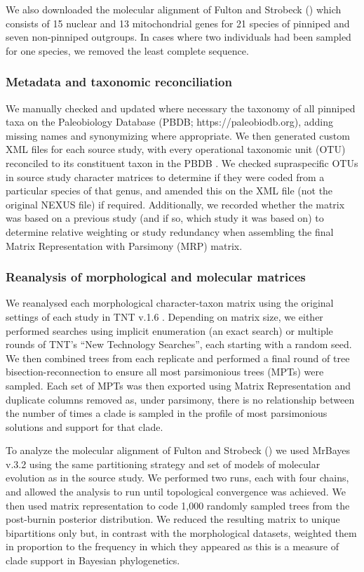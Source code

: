 \documentclass[a4paper, 12pt]{article}
\begin{document}
\noindent We also downloaded the molecular alignment of Fulton and Strobeck (\citeyear{fulton2010multiple}) which consists of 15 nuclear and 13 mitochondrial genes for 21 species of pinniped and seven non-pinniped outgroups. In cases where two individuals had been sampled for one species, we removed the least complete sequence.

\subsubsection{Metadata and taxonomic reconciliation} 

We manually checked and updated where necessary the taxonomy of all pinniped taxa on the Paleobiology Database (PBDB; https://paleobiodb.org), adding missing names and synonymizing where appropriate. We then generated custom XML files for each source study, with every operational taxonomic unit (OTU) reconciled to its constituent taxon in the PBDB \citep{peters2016paleobiology}. We checked supraspecific OTUs in source study character matrices to determine if they were coded from a particular species of that genus, and amended this on the XML file (not the original NEXUS file) if required. Additionally, we recorded whether the matrix was based on a previous study (and if so, which study it was based on) to determine relative weighting or study redundancy when assembling the final Matrix Representation with Parsimony (MRP) matrix. 

\subsubsection{Reanalysis of morphological and molecular matrices} 

We reanalysed each morphological character-taxon matrix using the original settings of each study in TNT v.1.6 \citep{goloboff2008tnt}. Depending on matrix size, we either performed searches using implicit enumeration (an exact search) or multiple rounds of TNT’s “New Technology Searches”, each starting with a random seed. We then combined trees from each replicate and performed a final round of tree bisection-reconnection to ensure all most parsimonious trees (MPTs) were sampled. Each set of MPTs was then exported using Matrix Representation and duplicate columns removed as, under parsimony, there is no relationship between the number of times a clade is sampled in the profile of most parsimonious solutions and support for that clade. 
 
\noindent To analyze the molecular alignment of Fulton and Strobeck (\citeyear{fulton2010multiple}) we used MrBayes v.3.2 \citep{ronquist2012mrbayes} using the same partitioning strategy and set of models of molecular evolution as in the source study. We performed two runs, each with four chains, and allowed the analysis to run until topological convergence was achieved. We then used matrix representation to code 1,000 randomly sampled trees from the post-burnin posterior distribution. We reduced the resulting matrix to unique bipartitions only but, in contrast with the morphological datasets, weighted them in proportion to the frequency in which they appeared as this is a measure of clade support in Bayesian phylogenetics.
\end{document}
